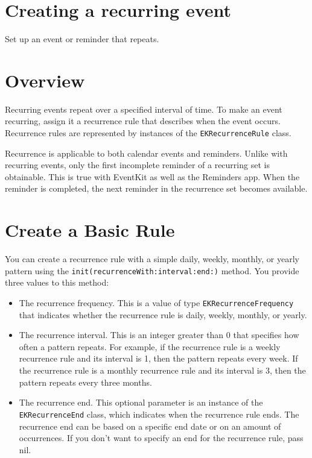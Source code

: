 \documentclass{article}
\title{}
\author{}
\date{}
\begin{document}
\usepackage{booktabs}

\section*{Creating a recurring event}
Set up an event or reminder that repeats.

\section*{Overview}
Recurring events repeat over a specified interval of time. To make an event recurring, assign it a recurrence rule that describes when the event occurs. Recurrence rules are represented by instances of the \texttt{EKRecurrenceRule} class.

Recurrence is applicable to both calendar events and reminders. Unlike with recurring events, only the first incomplete reminder of a recurring set is obtainable. This is true with EventKit as well as the Reminders app. When the reminder is completed, the next reminder in the recurrence set becomes available.

\section*{Create a Basic Rule}
You can create a recurrence rule with a simple daily, weekly, monthly, or yearly pattern using the \texttt{init(recurrenceWith:interval:end:)} method. You provide three values to this method:

\begin{itemize}
    \item The recurrence frequency. This is a value of type \texttt{EKRecurrenceFrequency} that indicates whether the recurrence rule is daily, weekly, monthly, or yearly.
    \item The recurrence interval. This is an integer greater than 0 that specifies how often a pattern repeats. For example, if the recurrence rule is a weekly recurrence rule and its interval is 1, then the pattern repeats every week. If the recurrence rule is a monthly recurrence rule and its interval is 3, then the pattern repeats every three months.
    \item The recurrence end. This optional parameter is an instance of the \texttt{EKRecurrenceEnd} class, which indicates when the recurrence rule ends. The recurrence end can be based on a specific end date or on an amount of occurrences. If you don't want to specify an end for the recurrence rule, pass nil.
\end{itemize}
\end{document}
